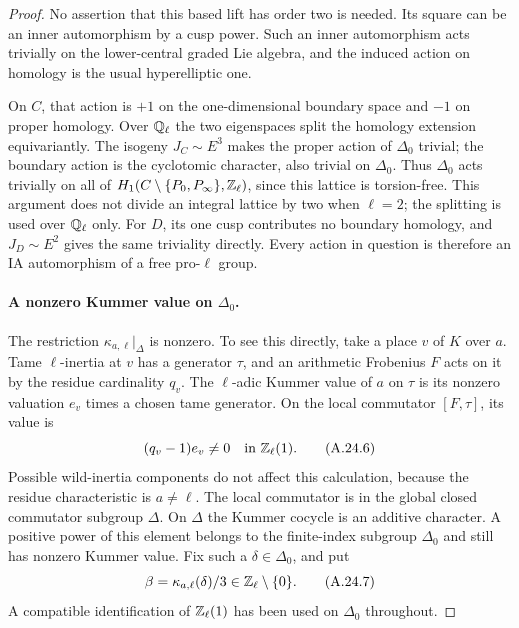\begin{proof}
No assertion that this based lift has order two is needed.
Its square can be an inner automorphism by a cusp power.
Such an inner automorphism acts trivially on the
lower-central graded Lie algebra, and the induced action on
homology is the usual hyperelliptic one.

On $C$, that action is $+1$ on the one-dimensional boundary
space and $-1$ on proper homology. Over $\mathbb Q_\ell$ the two
eigenspaces split the homology extension equivariantly.
The isogeny $J_C\sim E^3$ makes the proper action of $\Delta_0$
trivial; the boundary action is the cyclotomic character,
also trivial on $\Delta_0$. Thus $\Delta_0$ acts trivially on
all of $H_1(C\setminus\{P_0,P_\infty\},\mathbb Z_\ell)$, since this
lattice is torsion-free. This argument does not divide an
integral lattice by two when $\ell=2$; the splitting is used
over $\mathbb Q_\ell$ only. For $D$, its one cusp contributes no
boundary homology, and $J_D\sim E^2$ gives the same
triviality directly. Every action in question is therefore
an IA automorphism of a free pro-$\ell$ group.

\paragraph{A nonzero Kummer value on $\Delta_0$.}
The restriction $\kappa_{a,\ell}|_\Delta$ is nonzero. To see
this directly, take a place $v$ of $K$ over $a$. Tame
$\ell$-inertia at $v$ has a generator $\tau$, and an
arithmetic Frobenius $F$ acts on it by the residue
cardinality $q_v$. The $\ell$-adic Kummer value of $a$ on
$\tau$ is its nonzero valuation $e_v$ times a chosen tame
generator. On the local commutator $[F,\tau]$, its value is
\[
                        (q_v-1)e_v\ne0
                       \quad\hbox{in }\mathbb Z_\ell(1).
                                                        \tag{A.24.6}
\]
Possible wild-inertia components do not affect this
calculation, because the residue characteristic is
$a\ne\ell$. The local commutator is in the global closed
commutator subgroup $\Delta$. On $\Delta$ the Kummer
cocycle is an additive character. A positive power of this
element belongs to the finite-index subgroup $\Delta_0$
and still has nonzero Kummer value. Fix such a
$\delta\in\Delta_0$, and put
\[
                         \beta=\kappa_{a,\ell}(\delta)/3
                              \in\mathbb Z_\ell\setminus\{0\}.
                                                        \tag{A.24.7}
\]
A compatible identification of $\mathbb Z_\ell(1)$ has been used
on $\Delta_0$ throughout.


\end{proof}
